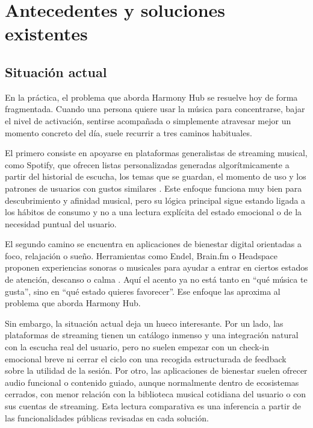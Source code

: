 \chapter{Antecedentes y soluciones existentes}
\label{ch:antecedentes}


\section{Situación actual}
\label{sec:situacion_actual}

En la práctica, el problema que aborda Harmony Hub se resuelve hoy de forma fragmentada. Cuando una persona quiere usar la música para concentrarse, bajar el nivel de activación, sentirse acompañada o simplemente atravesar mejor un momento concreto del día, suele recurrir a tres caminos habituales.

El primero consiste en apoyarse en plataformas generalistas de streaming musical, como Spotify, que ofrecen listas personalizadas generadas algorítmicamente a partir del historial de escucha, los temas que se guardan, el momento de uso y los patrones de usuarios con gustos similares \cite{spotify_playlists}. Este enfoque funciona muy bien para descubrimiento y afinidad musical, pero su lógica principal sigue estando ligada a los hábitos de consumo y no a una lectura explícita del estado emocional o de la necesidad puntual del usuario.

El segundo camino se encuentra en aplicaciones de bienestar digital orientadas a foco, relajación o sueño. Herramientas como Endel, Brain.fm o Headspace proponen experiencias sonoras o musicales para ayudar a entrar en ciertos estados de atención, descanso o calma \cite{endel_technology,brainfm_official,headspace_focus}. Aquí el acento ya no está tanto en ``qué música te gusta'', sino en ``qué estado quieres favorecer''. Ese enfoque las aproxima al problema que aborda Harmony Hub.

Sin embargo, la situación actual deja un hueco interesante. Por un lado, las plataformas de streaming tienen un catálogo inmenso y una integración natural con la escucha real del usuario, pero no suelen empezar con un check-in emocional breve ni cerrar el ciclo con una recogida estructurada de feedback sobre la utilidad de la sesión. Por otro, las aplicaciones de bienestar suelen ofrecer audio funcional o contenido guiado, aunque normalmente dentro de ecosistemas cerrados, con menor relación con la biblioteca musical cotidiana del usuario o con sus cuentas de streaming. Esta lectura comparativa es una inferencia a partir de las funcionalidades públicas revisadas en cada solución.

